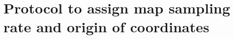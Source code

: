 \section{Protocol to assign map sampling rate and origin of coordinates}
\label{app:asignOrigAndSampling}%

